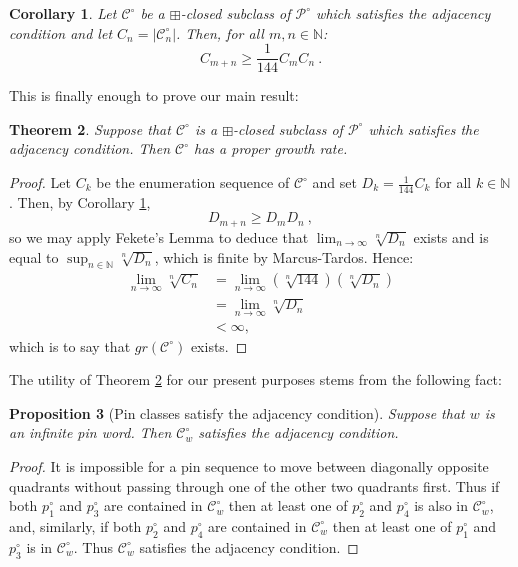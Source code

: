 \documentclass[11pt,a4paper]{article}
\newtheorem{thm}{Theorem}[section]
\newtheorem{prop}[thm]{Proposition}
\newtheorem{cor}[thm]{Corollary}
\theoremstyle{definition}
\begin{document}
\begin{cor}\label{supermultbound}
Let $\mathcal{C}^{\circ}$ be a $\boxplus$-closed subclass of $\mathcal{P}^{\circ}$ which satisfies the adjacency condition and let $C_{n} = |\mathcal{C}^{\circ}_{n}|$. Then, for all $m,n \in \mathbb{N}$:
\[
C_{m+n} \geq \frac{1}{144}C_{m}C_{n} \ .
\]
\end{cor}

This is finally enough to prove our main result:

\begin{thm} \label{grexist}
Suppose that $\mathcal{C}^{\circ}$ is a $\boxplus$-closed subclass of $\mathcal{P}^{\circ}$ which satisfies the adjacency condition. Then $\mathcal{C}^{\circ}$ has a proper growth rate.
\end{thm}

\begin{proof}
Let $C_{k}$ be the enumeration sequence of $\mathcal{C}^{\circ}$ and set $D_{k} = \frac{1}{144}C_{k}$ for all $k \in \mathbb{N}$. Then, by Corollary \ref{supermultbound},
\[
D_{m+n} \geq D_{m}D_{n} \ ,
\]
so we may apply Fekete's Lemma to deduce that $\lim_{n\rightarrow\infty}\sqrt[n]{D_{n}}$ exists and is equal to $\sup_{n\in\mathbb{N}}\sqrt[n]{D_{n}}$, which is finite by Marcus-Tardos. Hence:
\[
\begin{split}
\lim_{n\rightarrow\infty}\sqrt[n]{C_{n}} & = \lim_{n\rightarrow\infty}(\sqrt[n]{144})(\sqrt[n]{D_{n}}) \\
 & = \lim_{n\rightarrow\infty}\sqrt[n]{D_{n}} \\
 & < \infty,
\end{split}
\]
which is to say that $gr(\mathcal{C}^{\circ})$ exists. \end{proof}

The utility of Theorem \ref{grexist} for our present purposes stems from the following fact: 

\begin{prop}[Pin classes satisfy the adjacency condition] \label{pinclassessatisfytheadjacencycondition}
Suppose that $w$ is an infinite pin word. Then $\mathcal{C}^{\circ}_{w}$ satisfies the adjacency condition.
\end{prop}

\begin{proof}
It is impossible for a pin sequence to move between diagonally opposite quadrants without passing through one of the other two quadrants first. Thus if both $p^{\circ}_{1}$ and $p^{\circ}_{3}$ are contained in $\mathcal{C}^{\circ}_{w}$ then at least one of $p^{\circ}_{2}$ and $p^{\circ}_{4}$ is also in $\mathcal{C}^{\circ}_{w}$, and, similarly, if both $p^{\circ}_{2}$ and $p^{\circ}_{4}$ are contained in $\mathcal{C}^{\circ}_{w}$ then at least one of $p^{\circ}_{1}$ and $p^{\circ}_{3}$ is in $\mathcal{C}^{\circ}_{w}$. Thus $\mathcal{C}^{\circ}_{w}$ satisfies the adjacency condition. \qedhere
\end{proof}
\end{document}
